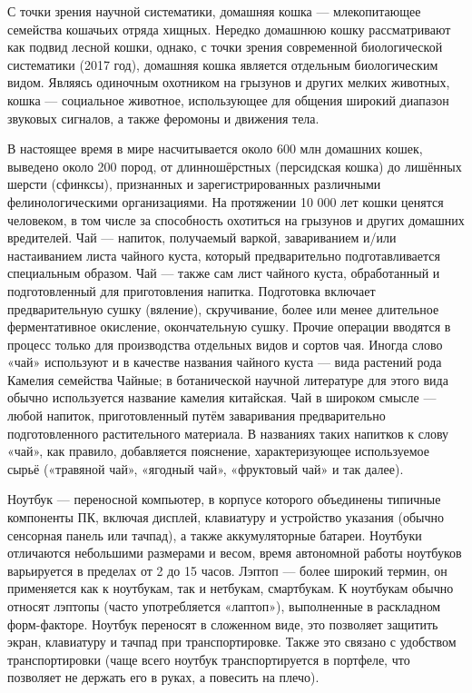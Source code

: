 \begin{frame}
	С точки зрения научной систематики, домашняя кошка — млекопитающее семейства кошачьих отряда хищных. Нередко домашнюю кошку рассматривают как подвид лесной кошки, однако, с точки зрения современной биологической систематики (2017 год), домашняя кошка является отдельным биологическим видом. Являясь одиночным охотником на грызунов и других мелких животных, кошка — социальное животное, использующее для общения широкий диапазон звуковых сигналов, а также феромоны и движения тела.
\end{frame}

\begin{frame}
	В настоящее время в мире насчитывается около 600 млн домашних кошек, выведено около 200 пород, от длинношёрстных (персидская кошка) до лишённых шерсти (сфинксы), признанных и зарегистрированных различными фелинологическими организациями. На протяжении 10 000 лет кошки ценятся человеком, в том числе за способность охотиться на грызунов и других домашних вредителей. Чай — напиток, получаемый варкой, завариванием и/или настаиванием листа чайного куста, который предварительно подготавливается специальным образом. Чай — также сам лист чайного куста, обработанный и подготовленный для приготовления напитка. Подготовка включает предварительную сушку (вяление), скручивание, более или менее длительное ферментативное окисление, окончательную сушку. Прочие операции вводятся в процесс только для производства отдельных видов и сортов чая. Иногда слово «чай» используют и в качестве названия чайного куста — вида растений рода Камелия семейства Чайные; в ботанической научной литературе для этого вида обычно используется название камелия китайская. Чай в широком смысле — любой напиток, приготовленный путём заваривания предварительно подготовленного растительного материала. В названиях таких напитков к слову «чай», как правило, добавляется пояснение, характеризующее используемое сырьё («травяной чай», «ягодный чай», «фруктовый чай» и так далее).
\end{frame}

\begin{frame}
	Ноутбук — переносной компьютер, в корпусе которого объединены типичные компоненты ПК, включая дисплей, клавиатуру и устройство указания (обычно сенсорная панель или тачпад), а также аккумуляторные батареи. Ноутбуки отличаются небольшими размерами и весом, время автономной работы ноутбуков варьируется в пределах от 2 до 15 часов. Лэптоп — более широкий термин, он применяется как к ноутбукам, так и нетбукам, смартбукам. К ноутбукам обычно относят лэптопы (часто употребляется «лаптоп»), выполненные в раскладном форм-факторе. Ноутбук переносят в сложенном виде, это позволяет защитить экран, клавиатуру и тачпад при транспортировке. Также это связано с удобством транспортировки (чаще всего ноутбук транспортируется в портфеле, что позволяет не держать его в руках, а повесить на плечо).
\end{frame}

